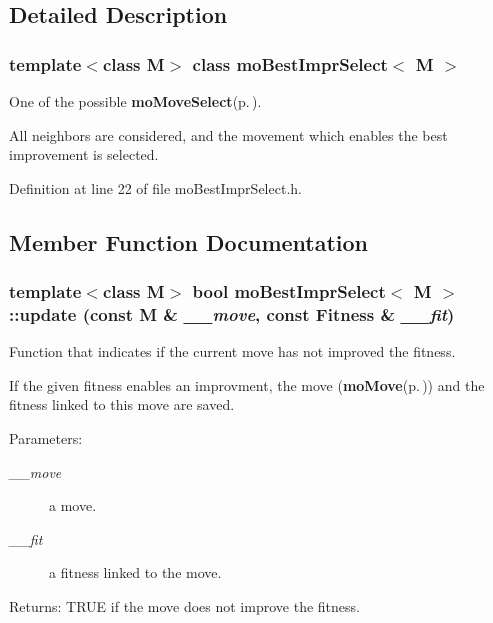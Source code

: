 \subsection{Detailed Description}
\subsubsection*{template$<$class M$>$ class mo\-Best\-Impr\-Select$<$ M $>$}

One of the possible {\bf mo\-Move\-Select}{\rm (p.\,\pageref{classmo_move_select})}. 

All neighbors are considered, and the movement which enables the best improvement is selected. 



Definition at line 22 of file mo\-Best\-Impr\-Select.h.

\subsection{Member Function Documentation}
\subsubsection{\setlength{\rightskip}{0pt plus 5cm}template$<$class M$>$ bool {\bf mo\-Best\-Impr\-Select}$<$ M $>$::update (const M \& {\em \_\-\_\-move}, const {\bf Fitness} \& {\em \_\-\_\-fit})\hspace{0.3cm}{\tt  [inline, virtual]}}\label{classmo_best_impr_select_d10e3e6f8a0277731e95ef506d064d6d}


Function that indicates if the current move has not improved the fitness. 

If the given fitness enables an improvment, the move ({\bf mo\-Move}{\rm (p.\,\pageref{classmo_move})}) and the fitness linked to this move are saved.

\begin{Desc}
\item[Parameters:]
\begin{description}
\item[{\em \_\-\_\-move}]a move. \item[{\em \_\-\_\-fit}]a fitness linked to the move. \end{description}
\end{Desc}
\begin{Desc}
\item[Returns:]TRUE if the move does not improve the fitness. \end{Desc}


